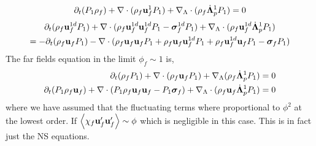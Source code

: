 \begin{equation*}
    \partial_t ( P_1  \rho_f )
    + \mathbf{\nabla}\cdot (
        \rho_f  \textbf{u}_f^1 P_1 
        )
    +  \mathbf{\nabla}_\Lambda \cdot ( \rho_f \dot{\bm\Lambda}_p^1 P_1 )
    = 
    0 
\end{equation*}
\begin{multline}
    \partial_t (\rho_f \textbf{u}_f^{1d}  P_1)
    + \mathbf{\nabla}\cdot (
         \rho_f \textbf{u}_f^{1d} \textbf{u}_f^{1d}  P_1
        - \bm\sigma_f^{1d} P_1
        )
    +  \mathbf{\nabla}_\Lambda \cdot ( \rho_f \textbf{u}_f^{1d} \dot{\bm\Lambda}_p^1  P_1 )\\
    = 
    - \partial_t (\rho_f \textbf{u}_f  P_1)
    - \mathbf{\nabla}\cdot (
        \rho_f \textbf{u}_f \textbf{u}_f  P_1
        + \rho_f \textbf{u}_f \textbf{u}_f^{1d}  P_1
        + \rho_f \textbf{u}_f^{1d} \textbf{u}_f  P_1
        - \bm\sigma_f P_1
        )
\end{multline}
The far fields equation in the limit $\phi_f \sim 1$ is, 
\begin{align*}
    \partial_t (\rho_f P_1 )  
    + \mathbf{\nabla}\cdot (\rho_f\textbf{u}_f P_1)
    + \mathbf{\nabla}_\Lambda (\rho_f\dot{\bm\Lambda}_p^1 P_1)
    = 
    0\\
    \partial_t (P_1 \rho_f\textbf{u}_f)  
    + \mathbf{\nabla}\cdot (
        P_1 \rho_f\textbf{u}_f\textbf{u}_f
        - P_1 \bm\sigma_f
    )
    + \mathbf{\nabla}_\Lambda\cdot(\rho_f \textbf{u}_f \dot{\bm\Lambda}_p^1 P_1)
    = 0
\end{align*}
where we have assumed that the fluctuating terms where proportional to $\phi^2$ at the lowest order. 
If $\left<\chi_f \textbf{u}_f' \textbf{u}_f'\right> \sim \phi $ which is negligible in this case. 
This is in fact just the NS equations. 

